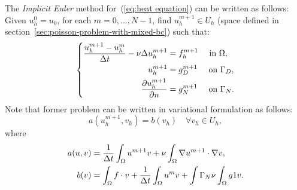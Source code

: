 \documentclass[12pt]{article}
\begin{document}
The \textit{Implicit Euler} method for~(\ref{eq:heat equation}) can be
written as follows:
Given $u^0_h=u_0$, for each $m=0,...,N-1$, find $u^{m+1}_h\in U_h$ (space
defined in section~\ref{sec:poisson-problem-with-mixed-bc}) such that:
\begin{equation}
  \label{eq:euler-implicit-heat-equation}
  \left\{
    \begin{aligned}
      \frac{u^{m+1}_h-u^m_h}{\Delta t} -\nu\Delta u^{m+1}_h &= f^{m+1}_h \quad \text{ in } \Omega, \\
      u^{m+1}_h &= g_D^{m+1} \quad \text{ on } \Gamma_D, \\
      \frac{\partial u^{m+1}_h}{\partial n} &= g_N^{m+1} \quad \text{ on } \Gamma_N.
    \end{aligned}
    \right.
\end{equation}
Note that former problem can be written in variational formulation as follows:
\begin{equation*}
  a(u^{m+1}_h,v_h) = b(v_h) \quad \forall v_h\in U_h,
\end{equation*}
where
\begin{equation*}
    \begin{aligned}
      a(u,v)&=\frac{1}{\Delta t} \int_\Omega u^{m+1} v + \nu\int_\Omega \nabla
      u^{m+1} \cdot \nabla v,
      \\
      b(v)  &= \int_\Omega f \cdot v
      +\frac{1}{\Delta t} \int_\Omega  u^{m} v
      +\int{\Gamma_N} \nu\int_\Omega g1 v.
    \end{aligned}
\end{equation*}
\end{document}
